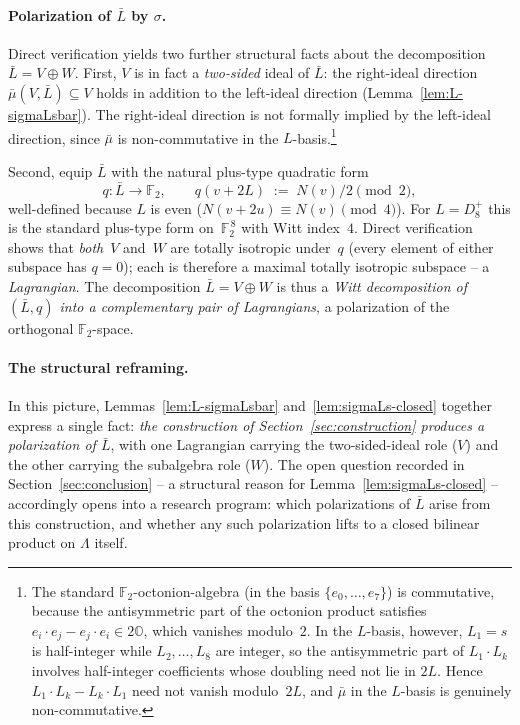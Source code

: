 \documentclass[twoside,english]{paper}
\numberwithin{equation}{section}
\numberwithin{figure}{section}
\theoremstyle{definition}
\theoremstyle{remark}
\newcommand{\OO}{\mathbb{O}}          %
\newcommand{\FF}{\mathbb{F}}
\newcommand{\LL}{\Lambda}             %
\newcommand{\Nrm}{N}                  %
\begin{document}
\paragraph{Polarization of $\bar L$ by $\sigma$.}
Direct verification yields two further structural facts about the
decomposition $\bar L = V \oplus W$.  First, $V$ is in fact a
\emph{two-sided} ideal of $\bar L$: the right-ideal direction
$\bar\mu(V, \bar L) \subseteq V$ holds in addition to the left-ideal
direction (Lemma~\ref{lem:L-sigmaLsbar}).  The right-ideal direction
is not formally implied by the left-ideal direction, since $\bar\mu$
is non-commutative in the $L$-basis.\footnote{The standard
$\FF_2$-octonion-algebra (in the basis $\{e_0,\ldots,e_7\}$) is
commutative, because the antisymmetric part of the octonion product
satisfies $e_i \cdot e_j - e_j \cdot e_i \in 2\OO$, which vanishes
modulo~$2$. In the $L$-basis, however, $L_1 = s$ is half-integer
while $L_2, \ldots, L_8$ are integer, so the antisymmetric part of
$L_1 \cdot L_k$ involves half-integer coefficients whose doubling
need not lie in $2L$. Hence $L_1 \cdot L_k - L_k \cdot L_1$ need not
vanish modulo~$2L$, and $\bar\mu$ in the $L$-basis is genuinely
non-commutative.}

Second, equip $\bar L$ with the natural plus-type quadratic form
\[
  q \colon \bar L \to \FF_2, \qquad q(v + 2L) \;:=\; \Nrm(v)/2 \pmod 2,
\]
well-defined because $L$ is even
($\Nrm(v + 2u) \equiv \Nrm(v) \pmod 4$).  For $L = D_8^+$ this is the
standard plus-type form on~$\FF_2^{\,8}$ with Witt index~$4$.  Direct
verification shows that \emph{both}~$V$ and~$W$ are totally isotropic
under~$q$ (every element of either subspace has $q = 0$); each is
therefore a maximal totally isotropic subspace -- a
\emph{Lagrangian}.  The decomposition $\bar L = V \oplus W$ is thus a
\emph{Witt decomposition of $(\bar L, q)$ into a complementary pair
of Lagrangians}, a polarization of the orthogonal $\FF_2$-space.

\paragraph{The structural reframing.}
In this picture, Lemmas~\ref{lem:L-sigmaLsbar}
and~\ref{lem:sigmaLs-closed} together express a single fact:
\emph{the construction of Section~\ref{sec:construction} produces a
polarization of $\bar L$}, with one Lagrangian carrying the
two-sided-ideal role ($V$) and the other carrying the subalgebra
role ($W$).  The open question recorded in
Section~\ref{sec:conclusion} -- a structural reason for
Lemma~\ref{lem:sigmaLs-closed} -- accordingly opens into a research
program: which polarizations of $\bar L$ arise from this
construction, and whether any such polarization lifts to a closed
bilinear product on $\LL$ itself.
\end{document}
